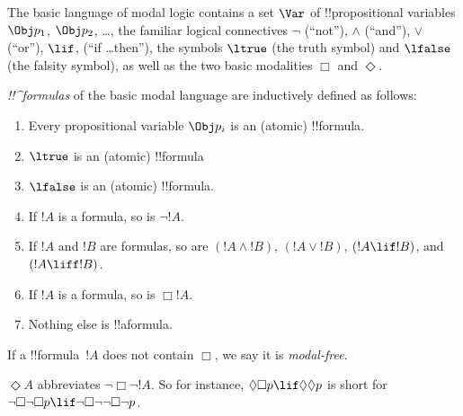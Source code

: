 \documentclass[../../../include/open-logic-section]{subfiles}
\begin{document}


The basic language of modal logic contains a set $\Var$ of
!!{propositional variable}s $\Obj p_1$, $\Obj p_2$, \dots, the
familiar logical connectives $\lnot$ (``not''), $\land$ (``and''),
$\lor$ (``or''), $\lif$, (``if \dots then''), the symbols $\ltrue$
(the truth symbol) and $\lfalse$ (the falsity symbol), as well as the
two basic modalities $\Box$ and $\Diamond$.

\begin{defn}
\emph{!!^{formula}s} of the basic modal language are inductively
  defined as follows:
\begin{enumerate}
\item Every propositional variable $\Obj p_i$ is an (atomic) !!{formula}.
\item $\ltrue$ is an (atomic) !!{formula}
\item $\lfalse$ is an (atomic) !!{formula}.
\item If $!A$ is a formula, so is $\lnot !A$.
\item If $!A$ and $!B$ are formulas, so are $(!A \land !B)$, $(!A \lor
  !B)$, $(!A \lif !B)$, and $(!A \liff !B)$.
\item If $!A$ is a formula, so is $\Box !A$.
\item Nothing else is !!a{formula}.
\end{enumerate}
If a !!{formula}~$!A$ does not contain $\Box$, we say
it is \emph{modal-free}. 
\end{defn}

$\Diamond A$ abbreviates $\lnot \Box \lnot !A$. So for instance,
$\Diamond\Box p \lif \Diamond\Diamond p$ is short for
$\lnot\Box\lnot\Box p \lif \lnot\Box\lnot\lnot \Box\lnot p$.
\end{document}
